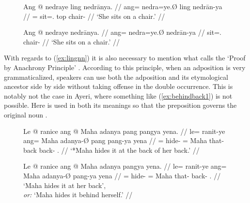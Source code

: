 
\begin{figure}[h]
\pex
\a\label{ex:lingpp}\begingl
	\gla Ang @ nedraye ling nedrānya. //
	\glb ang= nedra=ye.Ø ling nedrān-ya //
	\glc \AgtT{}= sit=\TsgF{}.\Top{} top chair-\Loc{} //
	\glft `She sits on a chair.' //
\endgl

\a\label{ex:prepunderspec}%
\begingl
	\gla Ang @ nedraye nedrānya. //
	\glb ang= nedra=ye.Ø nedrān-ya //
	\glc \AgtT{} sit=\TsgF{}.\Top{} chair-\Loc{} //
	\glft `She sits on a chair.' //
\endgl\xe
\end{figure}

With regards to (\ref{ex:lingnn}) it is also necessary to mention what
\citet{hagege2010} calls the `Proof by Anachrony Principle'
\citep[158--159]{hagege2010}. According to this principle, when an adposition
is very grammaticalized, speakers can use both the adposition and its
etymological ancestor side by side without taking offense in the double
occurrence. This is notably not the case in Ayeri, where something like
(\ref{ex:behindback1}) is not possible. Here  is used in both
its meanings so that the preposition  governs the
original noun .

\begin{figure}[h]
\pex
\a\label{ex:behindback1}\ljudge* \begingl
	\gla Le @ ranice ang @ Maha adanya pang pangya yena. //
	\glb le= ranit-ye ang= Maha adanya-Ø pang pang-ya yena //
	\glc \PatTI{}= hide-\TsgF{} \Aarg{}= Maha that-\Top{} back back-\Loc{} 
		\TsgF{}.\Gen{} //
	\glft `*Maha hides it at the back of her back.' //
\endgl

\a\label{ex:behindback2}\begingl
	\gla Le @ ranice ang @ Maha adanya pangya yena. //
	\glb le= ranit-ye ang= Maha adanya-Ø pang-ya yena //
	\glc \PatTI{}= hide-\TsgF{} \Aarg{}= Maha that-\Top{} back-\Loc{} 
		\TsgF{}.\Gen{} //
	\glft `Maha hides it at her back',\\
		\textit{or:} `Maha hides it behind herself.' //
\endgl
\xe
\end{figure}

